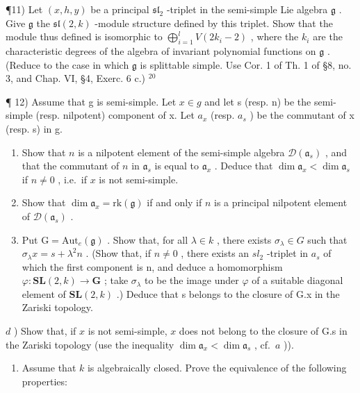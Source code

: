 ¶11) Let \((x,h,y)\) be a principal \(\mathfrak{sl}_2\) -triplet in the semi-simple Lie algebra \(\mathfrak{g}\) . Give \(\mathfrak{g}\) the \(\mathfrak{sl}(2,k)\) -module structure defined by this triplet. Show that the module thus defined is isomorphic to \(\bigoplus_{i=1}^{l} V(2k_i - 2)\) , where the \(k_i\) are the characteristic degrees of the algebra of invariant polynomial functions on \(\mathfrak{g}\) . (Reduce to the case in which \(\mathfrak{g}\) is splittable simple. Use Cor. 1 of Th. 1 of §8, no. 3, and Chap. VI, §4, Exerc. 6 c.) \(^{20}\)

¶ 12) Assume that g is semi-simple. Let \(x \in g\) and let s (resp. n) be the semi-simple (resp. nilpotent) component of x. Let \(a_{x}\) (resp. \(a_{s}\) ) be the commutant of x (resp. s) in g.

\begin{enumerate}
\def\labelenumi{\alph{enumi})}
\item
  Show that \(n\) is a nilpotent element of the semi-simple algebra \(\mathcal{D}(\mathfrak{a}_s)\) , and that the commutant of \(n\) in \(\mathfrak{a}_s\) is equal to \(\mathfrak{a}_x\) . Deduce that \(\dim \mathfrak{a}_x < \dim \mathfrak{a}_s\) if \(n \neq 0\) , i.e.~if \(x\) is not semi-simple.
\item
  Show that \(\dim \mathfrak{a}_x = \mathrm{rk}(\mathfrak{g})\) if and only if \(n\) is a principal nilpotent element of \(\mathcal{D}(\mathfrak{a}_s)\) .
\item
  Put \(\mathrm{G} = \mathrm{Aut}_{e}(\mathfrak{g})\) . Show that, for all \(\lambda \in k\) , there exists \(\sigma_{\lambda} \in G\) such that \(\sigma_{\lambda}x = s + \lambda^{2}n\) . (Show that, if \(n \neq 0\) , there exists an \(sl_{2}\) -triplet in \(a_{s}\) of which the first component is n, and deduce a homomorphism \(\varphi : \mathbf{SL}(2, k) \to \mathbf{G}\) ; take \(\sigma_{\lambda}\) to be the image under \(\varphi\) of a suitable diagonal element of \(\mathbf{SL}(2, k)\) .) Deduce that s belongs to the closure of G.x in the Zariski topology.
\end{enumerate}

\(d\) ) Show that, if \(x\) is not semi-simple, \(x\) does not belong to the closure of G.s in the Zariski topology (use the inequality \(\dim \mathfrak{a}_x < \dim \mathfrak{a}_s\) , cf.~\(a\) )).

\begin{enumerate}
\def\labelenumi{\alph{enumi})}
\setcounter{enumi}{4}
\tightlist
\item
  Assume that \(k\) is algebraically closed. Prove the equivalence of the following properties:
\end{enumerate}

